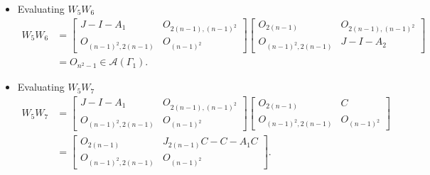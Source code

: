 \begin{itemize}
    \item Evaluating $W_5W_6$
    \begin{align*}
        W_5W_6
        &= \begin{bmatrix}
            J-I-A_1 & O_{2(n-1), (n-1)^2} \\
            O_{(n-1)^2, 2(n-1)} & O_{(n-1)^2}
        \end{bmatrix}\begin{bmatrix}
            O_{2(n-1)} & O_{2(n-1), (n-1)^2} \\
            O_{(n-1)^2, 2(n-1)} & J-I-A_2
        \end{bmatrix}\\
        &= O_{n^2-1}\in\mathcal{A}(\Gamma_1).
    \end{align*}
    
    \item Evaluating $W_5W_7$
    \begin{align*}
        W_5W_7
        &= \begin{bmatrix}
            J-I-A_1 & O_{2(n-1), (n-1)^2} \\
            O_{(n-1)^2, 2(n-1)} & O_{(n-1)^2}
        \end{bmatrix}\begin{bmatrix}
            O_{2(n-1)} & C \\
            O_{(n-1)^2, 2(n-1)} & O_{(n-1)^2}
        \end{bmatrix}\\
        &= \begin{bmatrix}
            O_{2(n-1)} & J_{2(n-1)}C-C - A_1C \\
            O_{(n-1)^2, 2(n-1)} & O_{(n-1)^2}
        \end{bmatrix}.
    \end{align*}


\end{itemize}

